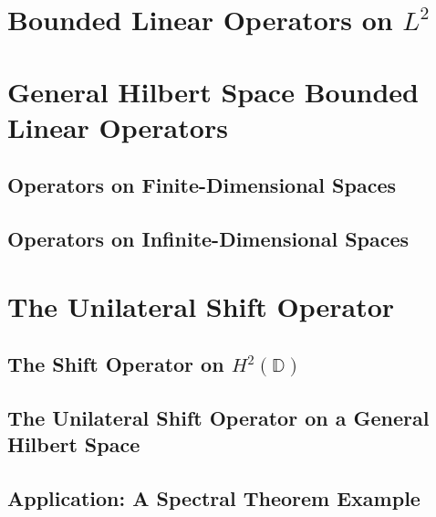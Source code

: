 \documentclass{article}
\theoremstyle{plain}
\begin{document}
\section*{Bounded Linear Operators on $ L^{2} $}


\section*{General Hilbert Space Bounded Linear Operators}

\subsection*{Operators on Finite-Dimensional Spaces}

\subsection*{Operators on Infinite-Dimensional Spaces}

\section*{The Unilateral Shift Operator}

\subsection*{The Shift Operator on $H^{2}\left(\mathbb{D}\right)$}

\subsection*{The Unilateral Shift Operator on a General Hilbert Space}

\subsection*{Application: A Spectral Theorem Example}
\end{document}
